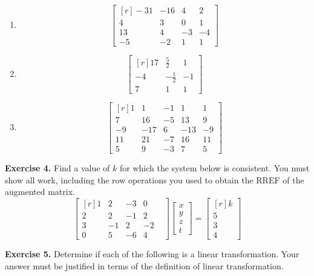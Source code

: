 \documentclass[12pt]{article}
\begin{document}
\begin{enumerate}
\item 
\[
\left[\begin{matrix*}[r]-31 & -16 & 4 & 2\\4 & 3 & 0 & 1\\13 & 4 & -3 & -4\\-5 & -2 & 1 & 1\end{matrix*}\right]
\]

\item
\[
\left[\begin{matrix*}[r]17 & \frac{5}{2} & 1\\-4 & - \frac{1}{2} & -1\\7 & 1 & 1\end{matrix*}\right]
\]

\item
\[
\left[\begin{matrix*}[r]1 & 1 & -1 & 1 & 1\\7 & 16 & -5 & 13 & 9\\-9 & -17 & 6 & -13 & -9\\11 & 21 & -7 & 16 & 11\\5 & 9 & -3 & 7 & 5\end{matrix*}\right]
\]
\end{enumerate}

\textbf{Exercise 4.} Find a value of $k$ for which the system below is consistent. You must show all work, including the row operations you used to obtain the RREF of the augmented matrix.
\[
\left[\begin{matrix*}[r]1 & 2 & -3 & 0 \\2 & 2 & -1 & 2 \\3 & -1 & 2 & -2 \\0 & 5 & -6 & 4 & \end{matrix*}\right]
\begin{bmatrix}x\\y\\z\\t\end{bmatrix}=
\begin{bmatrix*}[r] k\\5\\3\\4\end{bmatrix*}
\]

\textbf{Exercise 5.} Determine if each of the following is a linear transformation. Your answer must be justified in terms of the definition of linear transformation.
\end{document}
